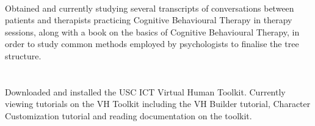 \documentclass{report}
\begin{document}
     \paragraph{}{\fontsize{15}{18}\selectfont Obtained and currently studying several transcripts of conversations between patients and therapists practicing Cognitive Behavioural Therapy in therapy sessions, along with a book on the basics of Cognitive Behavioural Therapy, in order to study common methods employed by psychologists to finalise the tree structure.}\\[+7mm]
     
     \\[-9mm]
     \paragraph{}{\fontsize{15}{18}\selectfont Downloaded and installed the USC ICT Virtual Human Toolkit. Currently viewing tutorials on the VH Toolkit including the VH Builder tutorial, Character Customization tutorial and reading documentation on the toolkit.}
     
\end{document}
